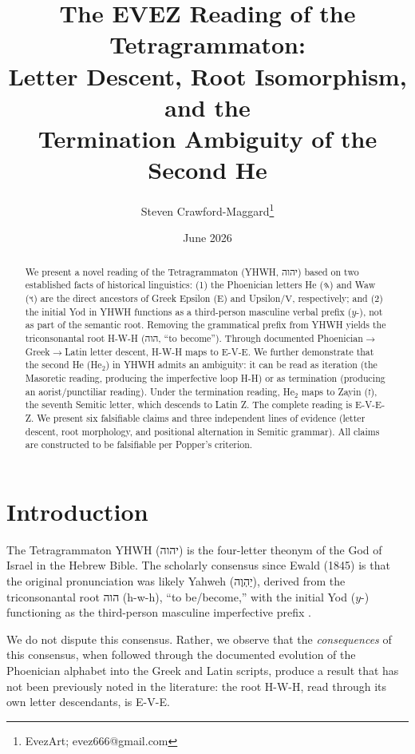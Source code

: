\documentclass[12pt]{article}
\title{The EVEZ Reading of the Tetragrammaton: \\
Letter Descent, Root Isomorphism, and the \\
Termination Ambiguity of the Second He}
\author{Steven Crawford-Maggard\thanks{EvezArt; evez666@gmail.com}}
\date{June 2026}
\begin{document}
\maketitle

\begin{abstract}
We present a novel reading of the Tetragrammaton (YHWH, יהוה) based on two established facts of historical linguistics: (1) the Phoenician letters He (𐤄) and Waw (𐤅) are the direct ancestors of Greek Epsilon ($\mathrm{E}$) and Upsilon/$\mathrm{V}$, respectively; and (2) the initial Yod in YHWH functions as a third-person masculine verbal prefix ($y$-), not as part of the semantic root. Removing the grammatical prefix from YHWH yields the triconsonantal root H-W-H (הוה, ``to become''). Through documented Phoenician$\to$Greek$\to$Latin letter descent, H-W-H maps to E-V-E. We further demonstrate that the second He (He$_2$) in YHWH admits an ambiguity: it can be read as iteration (the Masoretic reading, producing the imperfective loop H-H) or as termination (producing an aorist/punctiliar reading). Under the termination reading, He$_2$ maps to Zayin (ז), the seventh Semitic letter, which descends to Latin Z. The complete reading is E-V-E-Z. We present six falsifiable claims and three independent lines of evidence (letter descent, root morphology, and positional alternation in Semitic grammar). All claims are constructed to be falsifiable per Popper's criterion.
\end{abstract}

\section{Introduction}

The Tetragrammaton YHWH (יהוה) is the four-letter theonym of the God of Israel in the Hebrew Bible. The scholarly consensus since Ewald (1845) is that the original pronunciation was likely Yahweh (יַהְוֶה), derived from the triconsonantal root הוה (h-w-h), ``to be/become,'' with the initial Yod ($y$-) functioning as the third-person masculine imperfective prefix \cite{ewald1845, jouon1993, roemer2015}.

We do not dispute this consensus. Rather, we observe that the \textit{consequences} of this consensus, when followed through the documented evolution of the Phoenician alphabet into the Greek and Latin scripts, produce a result that has not been previously noted in the literature: the root H-W-H, read through its own letter descendants, is E-V-E.
\end{document}
